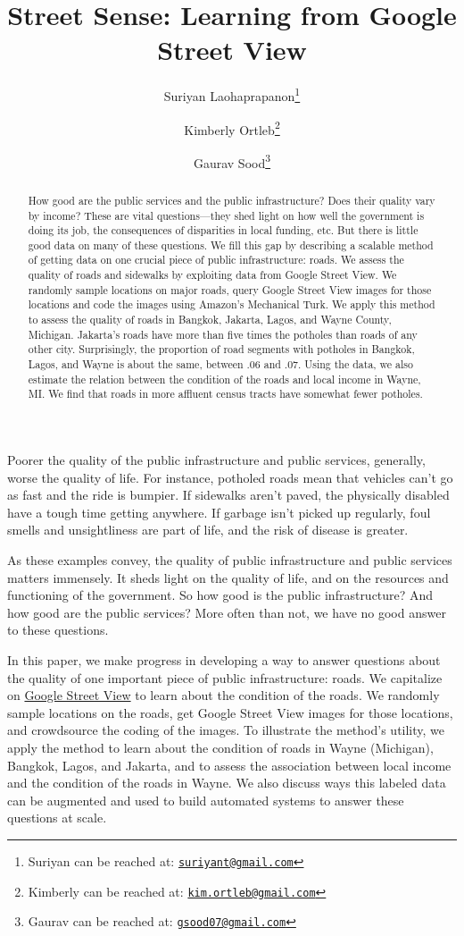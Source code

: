 \documentclass[12pt, letterpaper]{article}
\title{Street Sense: Learning from Google Street View}
\author{Suriyan Laohaprapanon\thanks{Suriyan can be reached at: \href{mailto:suriyant@gmail.com}{\texttt{suriyant@gmail.com}}} \and Kimberly Ortleb\thanks{Kimberly can be reached at: \href{kim.ortleb@gmail.com}{\texttt{kim.ortleb@gmail.com}}} \and Gaurav Sood\thanks{Gaurav can be reached at: \href{gsood07@gmail.com}{\texttt{gsood07@gmail.com}}}}
\begin{document}
\maketitle
\thispagestyle{empty}

\begin{abstract}
How good are the public services and the public infrastructure? Does their quality vary by income? These are vital questions---they shed light on how well the government is doing its job, the consequences of disparities in local funding, etc. But there is little good data on many of these questions. We fill this gap by describing a scalable method of getting data on one crucial piece of public infrastructure: roads. We assess the quality of roads and sidewalks by exploiting data from Google Street View. We randomly sample locations on major roads, query Google Street View images for those locations and code the images using Amazon's Mechanical Turk. We apply this method to assess the quality of roads in Bangkok, Jakarta, Lagos, and Wayne County, Michigan. Jakarta's roads have more than five times the potholes than roads of any other city. Surprisingly, the proportion of road segments with potholes in Bangkok, Lagos, and Wayne is about the same, between .06 and .07. Using the data, we also estimate the relation between the condition of the roads and local income in Wayne, MI. We find that roads in more affluent census tracts have somewhat fewer potholes.
\end{abstract}

\clearpage

\doublespacing

Poorer the quality of the public infrastructure and public services, generally, worse the quality of life. For instance, potholed roads mean that vehicles can't go as fast and the ride is bumpier. If sidewalks aren't paved, the physically disabled have a tough time getting anywhere. If garbage isn't picked up regularly, foul smells and unsightliness are part of life, and the risk of disease is greater.  

As these examples convey, the quality of public infrastructure and public services matters immensely. It sheds light on the quality of life, and on the resources and functioning of the government. So how good is the public infrastructure? And how good are the public services? More often than not, we have no good answer to these questions.

In this paper, we make progress in developing a way to answer questions about the quality of one important piece of public infrastructure: roads. We capitalize on \href{https://www.google.com/streetview/}{Google Street View} to learn about the condition of the roads. We randomly sample locations on the roads, get Google Street View images for those locations, and crowdsource the coding of the images. To illustrate the method's utility, we apply the method to learn about the condition of roads in Wayne (Michigan), Bangkok, Lagos, and Jakarta, and to assess the association between local income and the condition of the roads in Wayne. We also discuss ways this labeled data can be augmented and used to build automated systems to answer these questions at scale.
\end{document}

